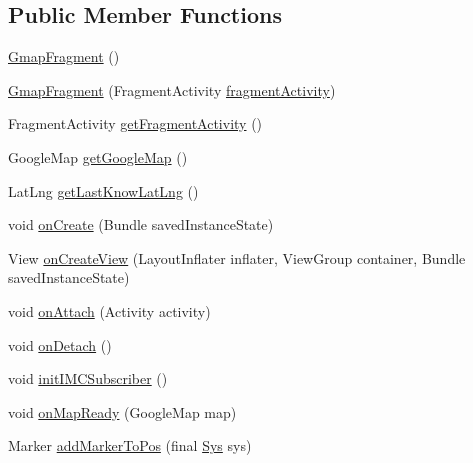 \subsection*{Public Member Functions}
\begin{DoxyCompactItemize}
\item 
\hyperlink{classpt_1_1lsts_1_1asa_1_1fragments_1_1GmapFragment_abba08e56a03203f0e2a706bea0fdaa7e}{Gmap\+Fragment} ()
\item 
\hyperlink{classpt_1_1lsts_1_1asa_1_1fragments_1_1GmapFragment_a81a61a16dad14fed83f228aac38c2076}{Gmap\+Fragment} (Fragment\+Activity \hyperlink{classpt_1_1lsts_1_1asa_1_1fragments_1_1GmapFragment_a53da1ea1f7df545a178174db9401a07e}{fragment\+Activity})
\item 
Fragment\+Activity \hyperlink{classpt_1_1lsts_1_1asa_1_1fragments_1_1GmapFragment_a2af202f161cb77fc72414977acb5d735}{get\+Fragment\+Activity} ()
\item 
Google\+Map \hyperlink{classpt_1_1lsts_1_1asa_1_1fragments_1_1GmapFragment_ae5e9ff1cb5c87d0770483c4800310321}{get\+Google\+Map} ()
\item 
Lat\+Lng \hyperlink{classpt_1_1lsts_1_1asa_1_1fragments_1_1GmapFragment_a919dc6ee6d4886304413fb5788c1be0d}{get\+Last\+Know\+Lat\+Lng} ()
\item 
void \hyperlink{classpt_1_1lsts_1_1asa_1_1fragments_1_1GmapFragment_a0cd69e702a6ce6f79c1dc37dd75309a2}{on\+Create} (Bundle saved\+Instance\+State)
\item 
View \hyperlink{classpt_1_1lsts_1_1asa_1_1fragments_1_1GmapFragment_afdb66417bfc2a66fa6df23717a2b0cc4}{on\+Create\+View} (Layout\+Inflater inflater, View\+Group container, Bundle saved\+Instance\+State)
\item 
void \hyperlink{classpt_1_1lsts_1_1asa_1_1fragments_1_1GmapFragment_ae8811088ca02fc335348969669f77f4d}{on\+Attach} (Activity activity)
\item 
void \hyperlink{classpt_1_1lsts_1_1asa_1_1fragments_1_1GmapFragment_a637e2efdd88fbb7afcddd531dc5a22e9}{on\+Detach} ()
\item 
void \hyperlink{classpt_1_1lsts_1_1asa_1_1fragments_1_1GmapFragment_aba78114684c514b15c0da8dfcd621f79}{init\+I\+M\+C\+Subscriber} ()
\item 
void \hyperlink{classpt_1_1lsts_1_1asa_1_1fragments_1_1GmapFragment_a7690e9427773cb0174132b325b0007bd}{on\+Map\+Ready} (Google\+Map map)
\item 
Marker \hyperlink{classpt_1_1lsts_1_1asa_1_1fragments_1_1GmapFragment_ab805a4d1de16fd77b8219e356736cc7b}{add\+Marker\+To\+Pos} (final \hyperlink{classpt_1_1lsts_1_1asa_1_1sys_1_1Sys}{Sys} sys)

\end{DoxyCompactItemize}
